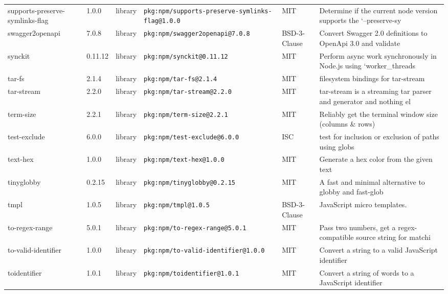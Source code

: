 \documentclass[11pt,a4paper]{article}
\begin{document}
\begin{longtable}{|p{4cm}|p{2cm}|p{1.6cm}|p{5cm}|p{1.5cm}|p{3.5cm}|}
\raggedright supports-preserve-symlinks-flag & 1.0.0 & library & \small\texttt{pkg:npm/supports-preserve-symlinks-flag@1.0.0} & MIT & \small Determine if the current node version supports the `--preserve-sy \\
\raggedright swagger2openapi & 7.0.8 & library & \small\texttt{pkg:npm/swagger2openapi@7.0.8} & BSD-3-Clause & \small Convert Swagger 2.0 definitions to OpenApi 3.0 and validate \\
\raggedright synckit & 0.11.12 & library & \small\texttt{pkg:npm/synckit@0.11.12} & MIT & \small Perform async work synchronously in Node.js using `worker\_threads \\
\raggedright tar-fs & 2.1.4 & library & \small\texttt{pkg:npm/tar-fs@2.1.4} & MIT & \small filesystem bindings for tar-stream \\
\raggedright tar-stream & 2.2.0 & library & \small\texttt{pkg:npm/tar-stream@2.2.0} & MIT & \small tar-stream is a streaming tar parser and generator and nothing el \\
\raggedright term-size & 2.2.1 & library & \small\texttt{pkg:npm/term-size@2.2.1} & MIT & \small Reliably get the terminal window size (columns \& rows) \\
\raggedright test-exclude & 6.0.0 & library & \small\texttt{pkg:npm/test-exclude@6.0.0} & ISC & \small test for inclusion or exclusion of paths using globs \\
\raggedright text-hex & 1.0.0 & library & \small\texttt{pkg:npm/text-hex@1.0.0} & MIT & \small Generate a hex color from the given text \\
\raggedright tinyglobby & 0.2.15 & library & \small\texttt{pkg:npm/tinyglobby@0.2.15} & MIT & \small A fast and minimal alternative to globby and fast-glob \\
\raggedright tmpl & 1.0.5 & library & \small\texttt{pkg:npm/tmpl@1.0.5} & BSD-3-Clause & \small JavaScript micro templates. \\
\raggedright to-regex-range & 5.0.1 & library & \small\texttt{pkg:npm/to-regex-range@5.0.1} & MIT & \small Pass two numbers, get a regex-compatible source string for matchi \\
\raggedright to-valid-identifier & 1.0.0 & library & \small\texttt{pkg:npm/to-valid-identifier@1.0.0} & MIT & \small Convert a string to a valid JavaScript identifier \\
\raggedright toidentifier & 1.0.1 & library & \small\texttt{pkg:npm/toidentifier@1.0.1} & MIT & \small Convert a string of words to a JavaScript identifier \\

\end{longtable}
\end{document}
